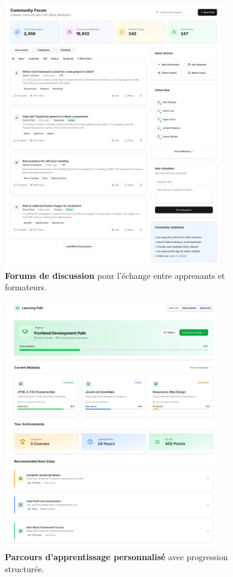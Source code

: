 \begin{figure}[H]
  \centering
  \includegraphics[width=0.85\textwidth,keepaspectratio]{old-reports/week_4_img/froms.jpeg}
  \caption{\textbf{Forums de discussion} pour l'échange entre apprenants et formateurs.}
  \label{fig:community_forums}
\end{figure}

\begin{figure}[H]
  \centering
  \includegraphics[width=0.85\textwidth,keepaspectratio]{old-reports/week_4_img/learnpath.jpeg}
  \caption{\textbf{Parcours d'apprentissage personnalisé} avec progression structurée.}
  \label{fig:learning_paths}
\end{figure}

